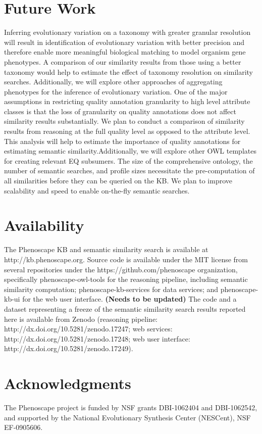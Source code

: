 \documentclass{article}
\begin{document}
\section{Future Work}
Inferring evolutionary variation on a taxonomy with greater granular resolution will result in identification of evolutionary variation with better precision and therefore enable more meaningful biological matching to model organism gene phenotypes. A comparison of our similarity results from those using a better taxonomy would help to estimate the effect of taxonomy resolution on similarity searches. Additionally, we will explore other approaches of aggregating phenotypes for the inference of evolutionary variation. One of the major assumptions in restricting quality annotation granularity to high level attribute classes is that the loss of granularity on quality annotations does not affect similarity results substantially. We plan to conduct a comparison of similarity results from reasoning at the full quality level as opposed to the attribute level. This analysis will help to estimate the importance of quality annotations for estimating semantic similarity.Additionally, we will explore other OWL templates for creating relevant EQ subsumers. The size of the comprehensive ontology, the number of semantic searches, and profile sizes necessitate the pre-computation of all similarities before they can be queried on the KB. We plan to improve scalability and speed to enable on-the-fly semantic searches. 


\section{Availability}
The Phenoscape KB and semantic similarity search is available at http://kb.phenoscape.org. Source code is available under the MIT license from several repositories under the https://github.com/phenoscape organization, specifically phenoscape-owl-tools for the reasoning pipeline, including semantic similarity computation; phenoscape-kb-services for data services; and phenoscape-kb-ui for the web user interface.  \textbf{(Needs to be updated)} The code and a dataset representing a freeze of the semantic similarity search results reported here is available from Zenodo (reasoning pipeline: http://dx.doi.org/10.5281/zenodo.17247; web services: http://dx.doi.org/10.5281/zenodo.17248; web user interface: http://dx.doi.org/10.5281/zenodo.17249).

\section{Acknowledgments}
The Phenoscape project is funded by NSF grants DBI-1062404 and DBI-1062542, and supported by the National Evolutionary Synthesis Center (NESCent), NSF EF-0905606. 
\end{document}
